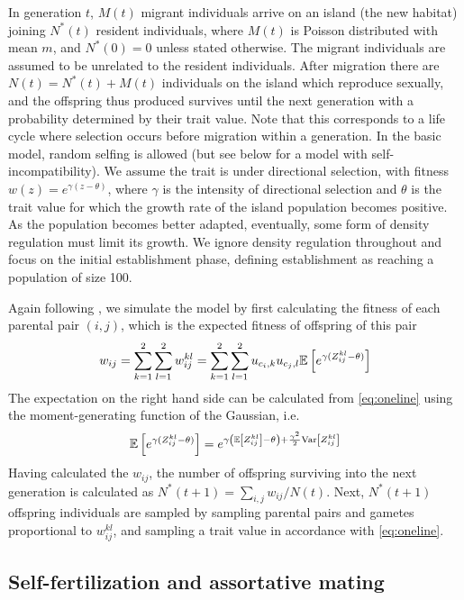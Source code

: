 \documentclass[12pt,a4paper]{article}
\begin{document}
In generation $t$, $M(t)$ migrant individuals arrive on an island (the new
habitat) joining $N^\ast(t)$ resident individuals, where $M(t)$ is Poisson
distributed with mean $m$, and $N^\ast(0)=0$ unless stated otherwise. 
The migrant individuals are assumed to be unrelated to the resident
individuals.
After migration there are $N(t) = N^\ast(t) + M(t)$ individuals on the island
which reproduce sexually, and the offspring thus produced survives until the
next generation with a probability determined by their trait value.
Note that this corresponds to a life cycle where selection occurs before
migration within a generation.
In the basic model, random selfing is allowed (but see below for a model with
self-incompatibility).
We assume the trait is under directional selection, with fitness $w(z) =
e^{\gamma(z - \theta)}$, where $\gamma$ is the intensity of directional
selection and $\theta$ is the trait value for which the growth rate of the
island population becomes positive.
As the population becomes better adapted, eventually, some form of density
regulation must limit its growth.
We ignore density regulation throughout and focus on the initial establishment
phase, defining establishment as reaching a population of size 100.

Again following \cite{barton2018}, we simulate the model by first calculating
the fitness of each parental pair $(i,j)$, which is the expected fitness of
offspring of this pair
\begin{equation}
  w_{ij}
    = \sum_{k=1}^2\sum_{l=1}^2 w_{ij}^{kl}
    = \sum_{k=1}^2\sum_{l=1}^2 u_{c_{i},k}u_{c_{j},l}
        \mathbb{E}\left[e^{\gamma(Z_{ij}^{kl} - \theta)}\right]
\end{equation}
The expectation on the right hand side can be calculated from \cref{eq:oneline}
using the moment-generating function of the Gaussian, i.e.
\begin{equation}
    \mathbb{E}\left[e^{\gamma(Z_{ij}^{kl} - \theta)}\right] 
    = e^{\gamma \left(\mathbb{E} \left[Z_{ij}^{kl}\right] -\theta\right) +
    \frac{\gamma^2}{2}
    \mathrm{Var}\left[Z_{ij}^{kl}\right]} 
\end{equation}
Having calculated the $w_{ij}$, the number of offspring surviving into the next
generation is calculated as $N^\ast(t+1) = \sum_{i,j}w_{ij}/N(t)$.
Next, $N^\ast(t+1)$ offspring individuals are sampled by sampling parental
pairs and gametes proportional to $w_{ij}^{kl}$, and sampling a trait value
in accordance with \cref{eq:oneline}. 


\subsection*{Self-fertilization and assortative mating}
\end{document}
